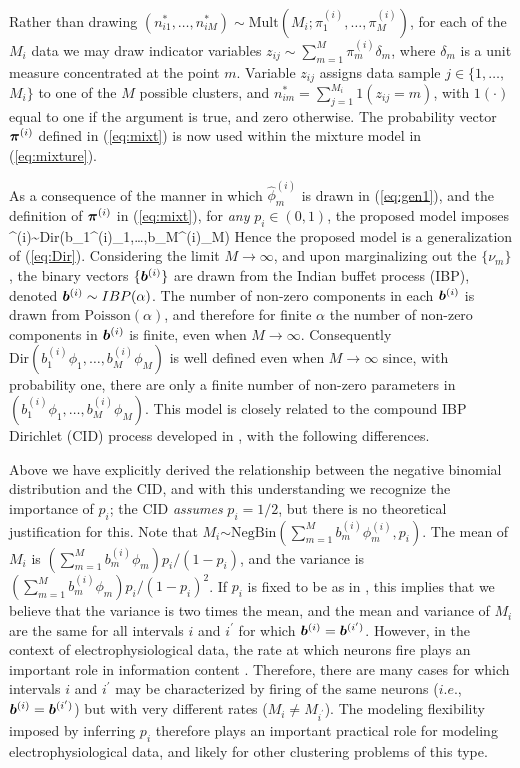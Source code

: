 \documentclass[journal]{IEEEtran}
\begin{document}
Rather than drawing $(n_{i1}^*,\dots,n_{iM}^*)\sim\mbox{Mult}(M_i;\pi_1^{(i)},\dots,\pi_M^{(i)})$, for each of the $M_i$ data we may draw indicator variables $z_{ij}\sim\sum_{m=1}^M\pi_m^{(i)}\delta_m$, where $\delta_m$ is a unit measure concentrated at the point $m$. Variable $z_{ij}$ assigns data sample $j\in\{1,\dots,$ $M_i$$\}$ to one of the $M$ possible clusters, and $n_{im}^*=\sum_{j=1}^{M_i} 1(z_{ij}=m)$, with $1(\cdot)$ equal to one if the argument is true, and zero otherwise. The probability vector $\boldsymbol{\pi}^{(i)}$ defined in (\ref{eq:mixt}) is now used within the mixture model in (\ref{eq:mixture}).


As a consequence of the manner in which $\hat{\phi}_m^{(i)}$ is drawn in (\ref{eq:gen1}), and the definition of $\boldsymbol{\pi}^{(i)}$ in (\ref{eq:mixt}), for \emph{any} $p_i\in(0,1)$, the proposed model imposes
\beq \piv^{(i)}\sim\mbox{Dir}(b_1^{(i)}{\phi}_1,\dots,b_M^{(i)}{\phi}_M)\eeq
Hence the proposed model is a generalization of (\ref{eq:Dir}). Considering the limit $M\rightarrow\infty$, and upon marginalizing out the $\{\nu_m\}$, the binary vectors $\{\boldsymbol{b}^{(i)}\}$ are drawn from the Indian buffet process (IBP), denoted $\boldsymbol{b}^{(i)}\sim\relax{IBP}(\alpha)$. The number of non-zero components in each $\boldsymbol{b}^{(i)}$ is drawn from $\mbox{Poisson}(\alpha)$, and therefore for finite $\alpha$ the number of non-zero components in $\boldsymbol{b}^{(i)}$ is finite, even when $M\rightarrow\infty$. Consequently $\mbox{Dir}(b_1^{(i)}{\phi}_1,\dots,b_M^{(i)}{\phi}_M)$ is well defined even when $M\rightarrow\infty$ since, with probability one, there are only a finite number of non-zero parameters in $(b_1^{(i)}{\phi}_1,\dots,b_M^{(i)}{\phi}_M)$. This model is closely related to the compound IBP Dirichlet (CID) process developed in \cite{compound}, with the following differences.

Above we have explicitly derived the relationship between the negative binomial distribution and the CID, and with this understanding we recognize the importance of $p_i$; the CID \emph{assumes} $p_i=1/2$, but there is no theoretical justification for this. Note that  $M_i$$\sim\mbox{NegBin}(\sum_{m=1}^M b_m^{(i)}{\phi}_m^{(i)},p_i)$. The mean of $M_i$ is $(\sum_{m=1}^M b_m^{(i)}{\phi}_m) p_i/(1-p_i)$, and the variance is $(\sum_{m=1}^M b_m^{(i)}{\phi}_m)p_i/(1-p_i)^2$. If $p_i$ is fixed to be   as in \cite{compound}, this implies that we believe that the variance is two times the mean, and the mean and variance of $M_i$ are the same for all intervals $i$ and $i^\prime$ for which $\boldsymbol{b}^{(i)}=\boldsymbol{b}^{(i^\prime)}$. However, in the context of electrophysiological data, the rate at which neurons fire plays an important role in information content \cite{Donoghue07}. Therefore, there are many cases for which intervals $i$ and $i^\prime$ may be characterized by firing of the same neurons ($i.e.$, $\boldsymbol{b}^{(i)}=\boldsymbol{b}^{(i^\prime)}$) but with very different rates ($M_i\neq M_{i^\prime}$). The modeling flexibility imposed by inferring $p_i$ therefore plays an important practical role for modeling electrophysiological data, and likely for other clustering problems of this type.
\end{document}
